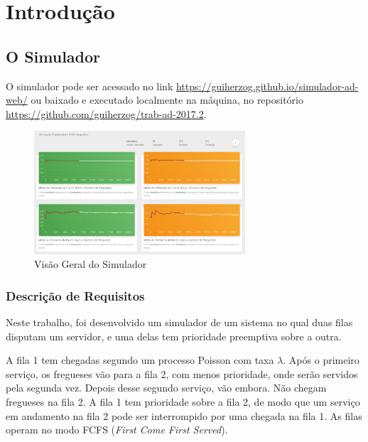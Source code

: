 \documentclass[a4paper,12pt]{report}
\begin{document}


\setlength{\parskip}{\baselineskip}%

\chapter{Introdução}

\section{O Simulador}

O simulador pode ser acessado no link \url{https://guiherzog.github.io/simulador-ad-web/} ou baixado e executado localmente na máquina, no repositório \url{https://github.com/guiherzog/trab-ad-2017.2}.

\begin{figure}[H]
\centering
\includegraphics[width=0.7\textwidth]{./graficos/overview.png}
\vspace{-3mm}
\caption{Visão Geral do Simulador}
\label{fig:overview}
\end{figure}

\subsection{Descrição de Requisitos}

Neste trabalho, foi desenvolvido um simulador de um sistema no qual duas filas disputam um servidor, e uma delas tem prioridade preemptiva sobre a outra.

A fila 1 tem chegadas segundo um processo Poisson com taxa $\lambda$. Após o primeiro serviço, os fregueses vão para a fila 2, com menos prioridade, onde serão servidos pela segunda vez. Depois desse segundo serviço, vão embora. Não chegam fregueses na fila 2. A fila 1 tem prioridade sobre a fila 2, de modo que um serviço em andamento na fila 2 pode ser interrompido por uma chegada na fila 1. As filas operam no modo FCFS (\emph{First Come First Served}).
\end{document}
